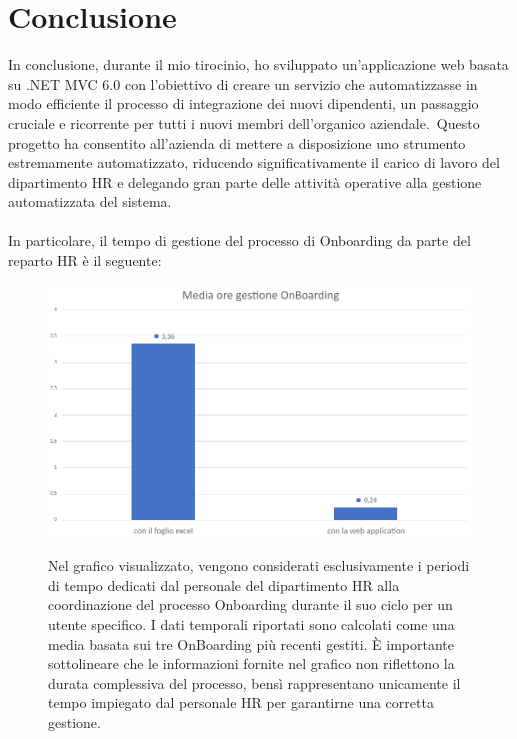 \chapter*{Conclusione} %
%
In conclusione, durante il mio tirocinio, ho sviluppato un'applicazione web basata su .NET MVC 6.0 con 
l'obiettivo di creare un servizio che automatizzasse in modo efficiente il 
processo di integrazione dei nuovi dipendenti, un passaggio cruciale e ricorrente per 
tutti i nuovi membri dell'organico aziendale.\ Questo progetto ha consentito 
all'azienda di mettere a disposizione uno strumento estremamente automatizzato, riducendo 
significativamente il carico di lavoro del dipartimento HR e delegando gran parte delle 
attività operative alla gestione automatizzata del sistema.
\\ \\ 
In particolare, il tempo di gestione del processo di Onboarding da parte del reparto HR  è il seguente:
\begin{figure}
	\centering
	\includegraphics[width=\textwidth]{img/conclusione1.png}
	\label{fig:conclusione1}
	\caption[media ore di gestione del processo di OnBoarding]{Nel grafico visualizzato, vengono considerati esclusivamente i periodi di tempo dedicati dal personale 
	del dipartimento HR alla coordinazione del processo Onboarding durante il suo ciclo per un utente specifico. I dati 
	temporali riportati sono calcolati come una media basata sui tre OnBoarding più recenti gestiti.
	È importante sottolineare che le informazioni fornite nel grafico non riflettono la durata complessiva del processo, 
	bensì rappresentano unicamente il tempo impiegato dal personale HR per garantirne una corretta gestione.}
\end{figure}

